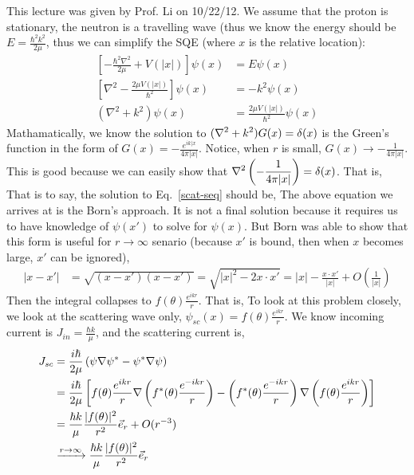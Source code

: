 \documentclass{school-22.101-notes}
\begin{document}
This lecture was given by Prof. Li on 10/22/12. We assume that the proton is stationary, the neutron is a travelling wave (thus we know the energy should be $\displaystyle E = \frac{\hbar^2 k^2}{2\mu}$, thus we can simplify the SQE (where $x$ is the relative location): 
\begin{align}
\left[ - \frac{\hbar^2 \nabla^2}{2 \mu} + V(|x|) \right] \psi(x) &= E \psi(x) \\
\left[ \nabla^2 - \frac{2 \mu V(|x|)}{\hbar^2} \right] \psi(x) &= - k^2 \psi(x) \\
(\nabla^2 + k^2) \psi(x) &= \frac{2 \mu V(|x|)}{\hbar^2} \psi(x) \label{scat-seq}
\end{align}
Mathamatically, we know the solution to $\displaystyle (\nabla^2 + k^2) G(x) = \delta(x)$ is the Green's function in the form of $\displaystyle G(x) = - \frac{e^{ik|x}}{4 \pi |x|}$. Notice, when $r$ is small, $G(x) \to - \frac{1}{4 \pi |x|}$. This is good because we can easily show that $\displaystyle \nabla^2 \left( - \frac{1}{4 \pi |x|} \right) = \delta (x)$. That is, 
That is to say, the solution to Eq.~\ref{scat-seq} should be, 
The above equation we arrives at is the Born's approach. It is not a final solution because it requires us to have knowledge of $\psi(x')$ to solve for $\psi(x)$. But Born was able to show that this form is useful for $r\to \infty$ senario (because $x'$ is bound, then when $x$ becomes large, $x'$ can be ignored), 
\begin{align}
|x-x'| &= \sqrt{(x-x')(x-x')} = \sqrt{|x|^2 - 2x \cdot x'} = |x| - \frac{x \cdot x'}{|x|} + O\left( \frac{1}{|x|} \right) 
\end{align}
Then the integral collapses to $f(\theta) \frac{e^{ikr}}{r}$. That is, 
To look at this problem closely, we look at the scattering wave only, $\psi_{sc} (x) = f(\theta) \frac{e^{ikr}}{r}$. We know incoming current is $J_{in} = \frac{\hbar k}{\mu}$, and the scattering current is,
\begin{align}
J_{sc} &= \frac{i \hbar}{2\mu} \left( \psi \nabla \psi^* - \psi^* \nabla \psi \right) \\
&= \frac{i \hbar}{2\mu} \left[ f (\theta) \frac{e^{ikr}}{r} \nabla \left(f^* (\theta) \frac{e^{-ikr}}{r} \right)   - \left(f^* (\theta) \frac{e^{-ikr}}{r} \right) \nabla \left( f (\theta) \frac{e^{ikr}}{r} \right)    \right] \\
&= \frac{\hbar k}{\mu} \frac{|f(\theta)|^2}{r^2} \vec{e}_r  + O(r^{-3}) \\
&\xrightarrow{r\to \infty} \frac{\hbar k}{\mu} \frac{|f(\theta)|^2}{r^2} \vec{e}_r
\end{align}
\end{document}
